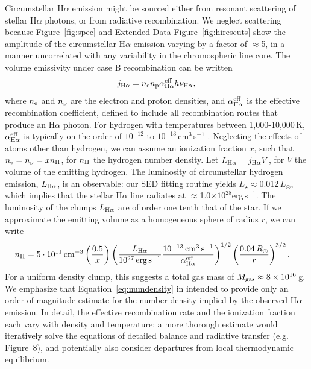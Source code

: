 \documentclass{nature3}
\begin{document}
\begin{methods}
Circumstellar H$\alpha$ emission might be sourced either from resonant
scattering of stellar H$\alpha$ photons, or from radiative
recombination.  We neglect scattering because Figure~\ref{fig:spec}
and Extended Data Figure~\ref{fig:hirescuts} show the amplitude of the circumstellar
H$\alpha$ emission varying by a factor of $\approx$5, in a manner
uncorrelated with any variability in the chromospheric line core.  The
volume emissivity under case B recombination can be written
\begin{equation} j_{\rm H\alpha} = n_{\rm e} n_{\rm p} \alpha^{\rm
eff}_{\rm H\alpha} h \nu_{\rm H\alpha}, \end{equation} where $n_{\rm
e}$ and $n_{\rm p}$ are the electron and proton densities, and
$\alpha^{\rm eff}_{\rm H\alpha}$ is the effective recombination
coefficient, defined to include all recombination routes that produce
an H$\alpha$ photon.  For hydrogen with temperatures between
1,000-10,000\,K, $\alpha^{\rm eff}_{\rm H\alpha}$ is typically on the
order of $10^{-12}$ to $10^{-13}$\,cm$^3$\,s$^{-1}$
\cite{Hummer1987,Draine2011}.  Neglecting the effects of atoms other
than hydrogen, we can assume an ionization fraction $x$, such that
$n_{\rm e} = n_{\rm p} = x n_{\rm H}$, for $n_{\rm H}$ the hydrogen
number density.  Let $L_{\rm H\alpha} = j_{\rm H\alpha} V$, for $V$
the volume of the emitting hydrogen.  The luminosity of circumstellar
hydrogen emission, $L_{\rm H\alpha}$, is an observable: our SED
fitting routine yields $L_\star$$\approx$0.012\,$L_\odot$, which
implies that the stellar H$\alpha$ line radiates at
$\approx$1.0$\times$$10^{28}$erg\,s$^{-1}$.  The luminosity of the
clumps $L_{\rm H\alpha}$ are of order one tenth that of the star.  If
we approximate the emitting volume as a homogeneous sphere of radius
$r$, we can write
\begin{align}
  n_{\rm H} &= 
  5 \cdot 10^{11}\,{\rm cm}^{-3}
  \left(
    \frac{0.5}{x}
  \right)
  \left( 
    \frac{ L_{\rm H\alpha} }{ 10^{27}\,{\rm erg\,s^{-1}} }
    \frac{ 10^{-13}\,{\rm cm^{3}\,s^{-1}} }{ \alpha^{\rm eff}_{\rm H\alpha} }
  \right)^{1/2}
  \left(
    \frac{ 0.04\,R_\odot }{ r }
  \right)^{3/2}.
  \label{eq:numdensity}
\end{align}
For a uniform density clump, this suggests a total gas mass of $M_{\rm
gas}\approx 8\times10^{16}$\,g.
We emphasize that Equation~\ref{eq:numdensity} in intended to provide
only an order of magnitude estimate for the number density implied by
the observed H$\alpha$ emission.  In detail, the effective
recombination rate and the ionization fraction each vary with density
and temperature; a more thorough estimate would iteratively solve the
equations of detailed balance and radiative transfer
(e.g.~\cite{CollierCameron1989} Figure~8), and potentially also
consider departures from local thermodynamic equilibrium.


\end{methods}
\end{document}
